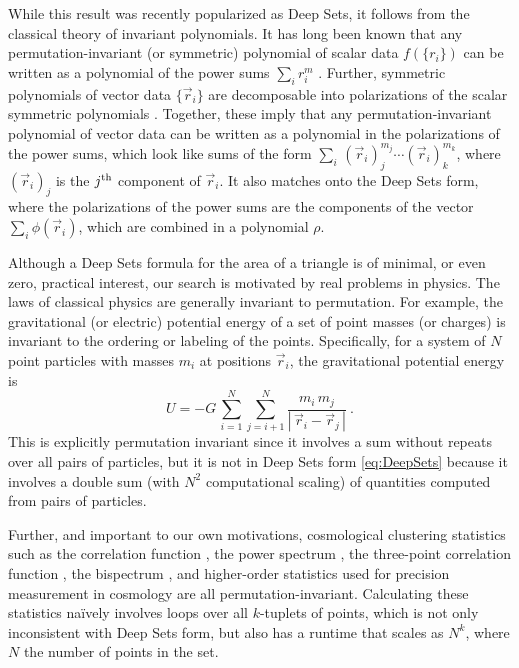 \documentclass[10pt]{article}
\newcommand{\abs}[1]{|\,{#1}\,|}
\begin{document}
While this result was recently popularized as Deep Sets, it follows from the classical theory of invariant polynomials.
It has long been known that any permutation-invariant (or symmetric) polynomial of scalar data $f(\{r_i\})$ can be written as a polynomial of the power sums $\sum_i r_i^m$ \citep{Waring1782}.
Further, symmetric polynomials of vector data $\{ \vec{r}_i \}$ are decomposable into polarizations of the scalar symmetric polynomials \citep{Weyl1939}.
Together, these imply that any permutation-invariant polynomial of vector data can be written as a polynomial in the polarizations of the power sums, which look like sums of the form $\sum_i \, (\vec{r}_{i})_{j}^{m_j} \cdots (\vec{r}_{i})_{k}^{m_k}$, where $(\vec{r}_i)_j$ is the $j^{\rm th}$ component of $\vec{r}_i$.
It also matches onto the Deep Sets form, where the polarizations of the power sums are the components of the vector $\sum_i \phi(\vec{r}_i)$, which are combined in a polynomial $\rho$.

Although a Deep Sets formula for the area of a triangle is of minimal, or even zero, practical interest, our search is motivated by real problems in physics.
The laws of classical physics are generally invariant to permutation.
For example, the gravitational (or electric) potential energy of a set of point masses (or charges) is invariant to the ordering or labeling of the points. 
Specifically, for a system of $N$ point particles with masses $m_i$ at positions $\vec{r}_i$, the gravitational potential energy is
\begin{equation}
\label{eq:EnergyNaive}
    U = -G \, \sum_{i=1}^{N} \sum_{j=i+1}^{N} \frac{m_i \, m_j}{\abs{\vec{r}_i - \vec{r}_j}} ~.
\end{equation}
This is explicitly permutation invariant since it involves a sum without repeats over all pairs of particles, but it is not in Deep Sets form \eqref{eq:DeepSets} because it involves a double sum (with $N^2$ computational scaling) of quantities computed from pairs of particles.

Further, and important to our own motivations, cosmological clustering statistics such as 
the correlation function \citep{Peebles1973},
the power spectrum \citep{Peebles1973},
the three-point correlation function \citep{PeeblesGroth1975},
the bispectrum \citep{FrySeldner1982},
and higher-order statistics \citep{Peebles1980book}
used for precision measurement in cosmology \citep[e.g.,][]{Eisenstein+2005BAO,Planck18PNG,Planck18Inflation,Cabass+2022}
are all permutation-invariant.
Calculating these statistics na\"ively involves loops over all $k$-tuplets of points, which is not only inconsistent with Deep Sets form, but also has a runtime that scales as $N^k$, where $N$ the number of points in the set.
\end{document}
